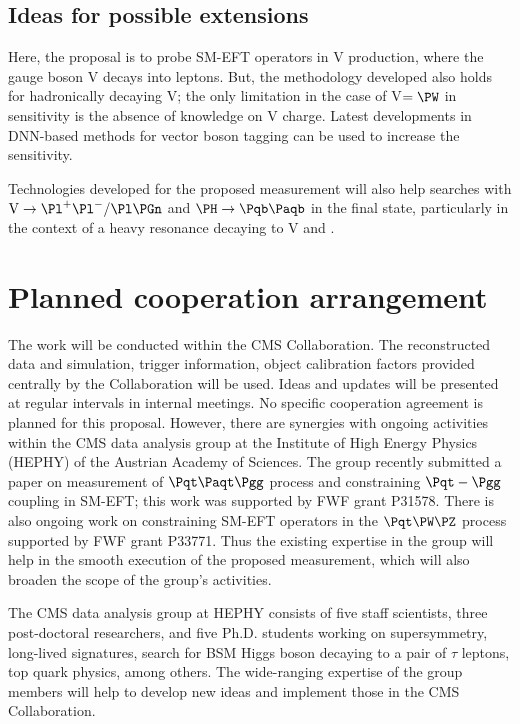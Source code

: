 \documentclass[a4paper,11pt]{article}
\newcommand{\Pb}{{{\Pqb}}\xspace}
\newcommand{\Pt}{{{\Pqt}}\xspace}
\newcommand{\PAb}{{{{\Paqb}}}\xspace}
\newcommand{\PAt}{{{{\Paqt}}}\xspace}
\renewcommand{\PV}{{{{V}}}\xspace}
\newcommand{\VH}{{{\PV}{\PH}}\xspace}
\begin{document}
\subsection{Ideas for possible extensions}

Here, the proposal is to probe SM-EFT operators in \VH production, where the gauge boson \PV decays into leptons. 
But, the methodology developed also holds for hadronically decaying \PV; 
the only limitation in the case of {\PV}$ ={\PW}$ in sensitivity is the absence of knowledge on \PV charge. 
Latest developments in DNN-based methods for vector boson tagging can be used to increase the sensitivity. 

Technologies developed for the proposed measurement will also help searches with $\textrm{\PV}\rightarrow \Pl^{+}\Pl^{-} / \Pl \Pgn$ and $\PH \to \Pb \PAb$ in the final state, particularly in the context of a heavy resonance decaying to \PV and {\PH}.


\section{Planned cooperation arrangement} 

The work will be conducted within the CMS Collaboration. The reconstructed data and simulation, trigger information, object calibration factors provided centrally by the Collaboration will be used. 
Ideas and updates will be presented at regular intervals in internal meetings. 
No specific cooperation agreement is planned for this proposal. 
However, there are synergies with ongoing activities within the CMS data analysis group at the Institute of High Energy Physics (HEPHY) of the Austrian Academy of Sciences. 
The group recently submitted a paper on measurement of $\Pt\PAt\Pgg$ process and constraining $\Pt-\Pgg$ coupling in SM-EFT; this work was supported by FWF grant P31578.
There is also ongoing work on constraining SM-EFT operators in the $\Pt\PW\PZ$ process supported by FWF grant P33771. 
Thus the existing expertise in the group will help in the smooth execution of the proposed measurement, which will also broaden the scope of the group's activities.

The CMS data analysis group at HEPHY consists of five staff scientists, three post-doctoral researchers, and five Ph.D. students working on supersymmetry, long-lived signatures, search for BSM Higgs boson decaying to a pair of $\tau$ leptons, top quark physics, among others. 
The wide-ranging expertise of the group members will help
to develop new ideas and implement those in the CMS Collaboration.
\end{document}
